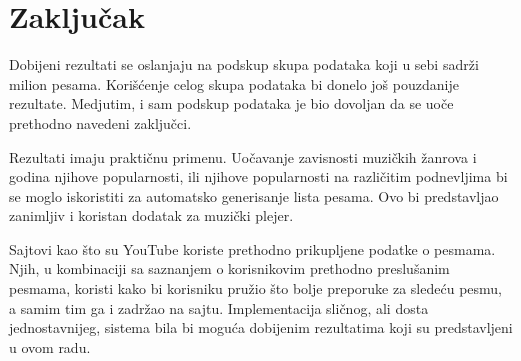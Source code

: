 \section{Zaključak}
\label{sec:Zakljucak}

Dobijeni rezultati se oslanjaju na podskup skupa podataka koji u sebi sadr\v{z}i milion pesama. Kori\v{s}\'c{}enje celog skupa podataka bi donelo jo\v{s} pouzdanije rezultate. Medjutim, i sam podskup podataka je bio dovoljan da se uo\v{c}e prethodno navedeni zaklju\v{c}ci.

Rezultati imaju prakti\v{c}nu primenu. Uo\v{c}avanje zavisnosti muzi\v{c}kih \v{z}anrova i godina njihove popularnosti, ili njihove popularnosti na razli\v{c}itim podnevljima bi se moglo iskoristiti za automatsko generisanje lista pesama. Ovo bi predstavljao zanimljiv i koristan dodatak za muzi\v{c}ki plejer.

Sajtovi kao \v{s}to su YouTube \cite{youtube} koriste prethodno prikupljene podatke o pesmama. Njih, u kombinaciji sa saznanjem o korisnikovim prethodno preslu\v{s}anim pesmama, koristi kako bi korisniku pru\v{z}io \v{s}to bolje preporuke za slede\'c{}u pesmu, a samim tim ga i zadr\v{z}ao na sajtu. Implementacija sli\v{c}nog, ali dosta jednostavnijeg, sistema bila bi mogu\'c{}a dobijenim rezultatima koji su predstavljeni u ovom radu.
